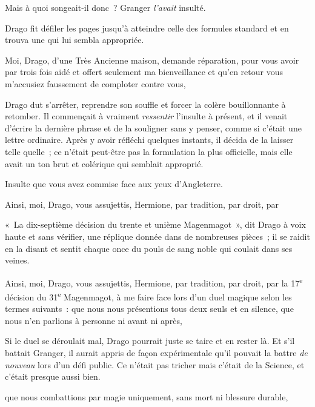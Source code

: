 Mais à quoi songeait-il donc~?
Granger \emph{l'avait} insulté.

Drago fit défiler les pages jusqu'à atteindre celle des formules standard et en trouva une qui lui sembla appropriée.

\begin{writtenNote}
Moi, Drago, d'une Très Ancienne maison, demande réparation, pour vous avoir par trois fois aidé et offert seulement ma bienveillance et qu'en retour vous m'accusiez {faussement} de comploter contre vous, \end{writtenNote}

Drago dut s'arrêter, reprendre son souffle et forcer la colère bouillonnante à retomber.
Il commençait à vraiment \emph{ressentir} l'insulte à présent, et il venait d'écrire la dernière phrase et de la souligner sans y penser, comme si c'était une lettre ordinaire.
Après y avoir réfléchi quelques instants, il décida de la laisser telle quelle~; ce n'était peut-être pas la formulation la plus officielle, mais elle avait un ton brut et colérique qui semblait approprié.

\begin{writtenNote}
Insulte que vous avez commise face aux yeux d'Angleterre.

Ainsi, moi, Drago, vous assujettis, Hermione, par tradition, par droit, par
\end{writtenNote}

«~La dix-septième décision du trente et unième Magenmagot~», dit Drago à voix haute et sans vérifier, une réplique donnée dans de nombreuses pièces~; il se raidit en la disant et sentit chaque once du pouls de sang noble qui coulait dans ses veines.

\begin{writtenNote}
Ainsi, moi, Drago, vous assujettis, Hermione, par tradition, par droit, par la 17\textsuperscript{e} décision du 31\textsuperscript{e} Magenmagot, à me faire face lors d'un duel magique selon les termes suivants~: que nous nous présentions tous deux seuls et en silence, que nous n'en parlions à personne ni avant ni après,\end{writtenNote}

Si le duel se déroulait mal, Drago pourrait juste se taire et en rester là.
Et s'il battait Granger, il aurait appris de façon expérimentale qu'il pouvait la battre \emph{de nouveau} lors d'un défi public.
Ce n'était pas tricher mais c'était de la Science, et c'était presque aussi bien.

\begin{writtenNote}
que nous combattions par magie uniquement, sans mort ni blessure durable,
\end{writtenNote}

